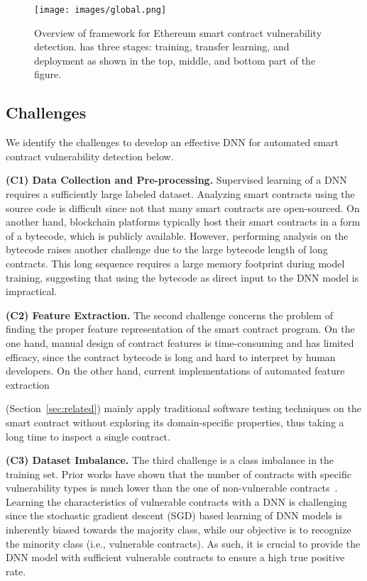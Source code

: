 \setlength{\belowcaptionskip}{-12pt}
\begin{figure*}
  \centering
  \texttt{[image: images/global.png]}
  \vspace{-0.5em}
  \caption{Overview of \sys{} framework for Ethereum smart contract vulnerability detection. \sys{} has three stages: training, transfer learning, and deployment as shown in the top, middle, and bottom part of the figure. 
  }
  \label{fig:global}
  \setlength{\belowcaptionskip}{-12pt}
\end{figure*}

\vspace{-0.5em}
\subsection{Challenges} \label{sec:challenges}
We identify the challenges to develop an effective DNN for automated smart contract
vulnerability detection below. 

\textbf{(C1) Data Collection and Pre-processing.} Supervised learning of a DNN requires a sufficiently large labeled dataset. Analyzing smart contracts using the source code is difficult since not that many smart contracts are open-sourced. On another hand, blockchain platforms typically host their smart contracts in a form of a bytecode, which is publicly available.
However, performing analysis on the bytecode raises another challenge due to the large bytecode length of long contracts.
This long sequence requires a large memory footprint during model training, suggesting that using the bytecode as direct input to the DNN model is impractical. 

\vspace{0.1em}
\textbf{(C2) Feature Extraction.} 
The second challenge concerns the problem of finding the proper feature representation of the smart contract program. 
On the one hand, manual design of contract features is time-consuming and has limited efficacy, since the contract bytecode is long and hard to interpret by human developers. On the other hand, current implementations of automated feature extraction~\cite{rw_contractward,rw_lstm,zhuangsmart}

(Section~\ref{sec:related}) mainly apply traditional software testing techniques on the smart contract without exploring its domain-specific properties, thus taking a long time to inspect a single contract.

\vspace{0.1em}
\textbf{(C3) Dataset Imbalance.} 
The third challenge is a class imbalance in the training set. 
Prior works have shown that the number of contracts with specific vulnerability types is much lower than the one of non-vulnerable contracts~\cite{rw_contractward}.
Learning the characteristics of vulnerable contracts with a DNN is challenging since the stochastic gradient descent (SGD) based learning of DNN models is inherently biased towards the majority class, while our objective is to recognize the minority class (i.e., vulnerable contracts). As such, it is crucial to provide the DNN model with sufficient vulnerable contracts to ensure a high true positive rate.

